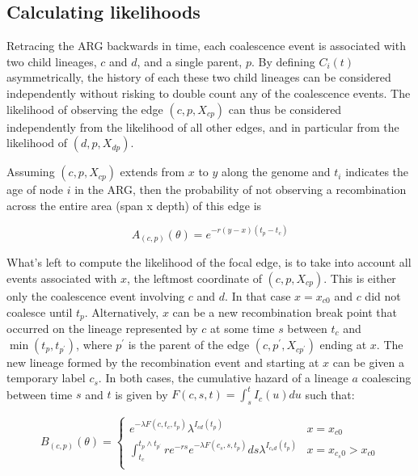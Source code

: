 \documentclass{article}
\begin{document}
\subsection{Calculating likelihoods} \label{par:liks}

Retracing the ARG backwards in time, each coalescence event is associated with two child
lineages, $c$ and $d$, and a single parent, $p$. By defining $C_i(t)$ asymmetrically,
the history of each these two child lineages can be considered independently without
risking to double count any of the coalescence events. The likelihood of
observing the edge $(c, p, X_{cp})$ can thus be considered independently from
the likelihood of all other edges, and in particular from the likelihood
of $(d, p, X_{dp})$.

Assuming $(c, p, X_{cp})$ extends from $x$ to $y$ along the genome and $t_i$
indicates the age of
node $i$ in the ARG, then the probability of not observing a recombination across the
entire area (span x depth) of this edge is

\begin{equation}\label{eq:span}
A_{(c, p)}(\theta) = e^{-r (y-x)(t_p - t_{c})}
\end{equation}

What's left to compute the likelihood of the focal edge, is to take into account
all events associated with $x$,
the leftmost coordinate of $(c, p, X_{cp})$.
This is either only the
coalescence event involving
$c$ and $d$. In that case $x=x_{c0}$ and $c$ did not coalesce until $t_p$.
Alternatively, $x$ can be a new recombination break point that
occurred on the lineage represented by $c$ at some time $s$ between $t_{c}$
and $\min(t_p, t_{p^{\prime}})$, where $p^{\prime}$ is the parent of the
edge $(c, p^{\prime}, X_{cp^{\prime}})$ ending at $x$. The new lineage formed
by the recombination event and starting at $x$ can be given a temporary label
$c_s$. In both cases, the cumulative hazard of a lineage $a$ coalescing
between time $s$ and $t$ is given by $F(c, s, t) = \int_{s}^{t} I_{c}(u)du$
such that:

\begin{equation}\label{eq:depth}
B_{(c, p)}(\theta) = \begin{cases}
e^{-\lambda F(c, t_c, t_p)} \lambda^{I_{cd}(t_p)} & x=x_{c0} \\
\int_{t_c}^{t_{p} \wedge t_{p^{\prime}}} r e^{-rs} e^{-\lambda F(c_s, s, t_{p})} ds \lambda^{I_{c_{s}d}(t_p)} & x=x_{c_{s}0}>x_{c0} \\
\end{cases}
\end{equation}
\end{document}

